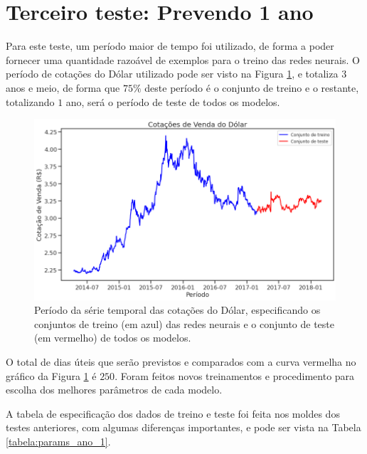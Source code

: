 \section{Terceiro teste: Prevendo 1 ano}

Para este teste, um período maior de tempo foi utilizado, de forma a poder fornecer uma quantidade razoável de exemplos para o treino das redes neurais. O período de cotações do Dólar utilizado pode ser visto na Figura \ref{fig:keras_treino_ano}, e totaliza $3$ anos e meio, de forma que $75\%$ deste período é o conjunto de treino e o restante, totalizando $1$ ano, será o período de teste de todos os modelos.

\begin{figure}[htb]
\centering
\includegraphics[width=13.1cm]{figuras/keras_treino_ano}
\caption{Período da série temporal das cotações do Dólar, especificando os conjuntos de treino (em azul) das redes neurais e o conjunto de teste (em vermelho) de todos os modelos.}
\label{fig:keras_treino_ano}
\end{figure}

O total de dias úteis que serão previstos e comparados com a curva vermelha no gráfico da Figura \ref{fig:keras_treino_ano} é $250$. Foram feitos novos treinamentos e procedimento para escolha dos melhores parâmetros de cada modelo.

A tabela de especificação dos dados de treino e teste foi feita nos moldes dos testes anteriores, com algumas diferenças importantes, e pode ser vista na Tabela \ref{tabela:params_ano_1}.


